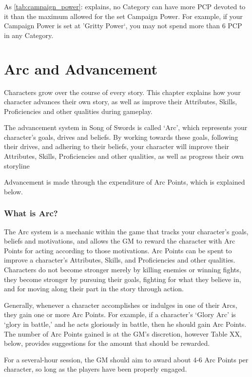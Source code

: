 \documentclass[oneside,11pt,english]{book}
\begin{document}
 
As \autoref{tab:campaign_power}:  explains, no Category can have more PCP devoted to it than the maximum allowed for the 
set Campaign Power. For example, if your Campaign Power is set at 'Gritty Power`, you may not spend 
more than 6 PCP in any Category. 
\chapter{Arc and Advancement}\label{ch:arc} 
\clearpage
Characters grow over the course of every story. This chapter explains how your character advances their 
own story, as well as improve their Attributes, Skills, Proficiencies and other qualities during gameplay. 
 

The advancement system in Song of Swords is called ‘Arc’, which represents your character’s goals, 
drives and beliefs. By working towards these goals, following their drives, and adhering to their beliefs, 
your character will improve their Attributes, Skills, Proficiencies and other qualities, as well as progress 
their own storyline 

 
Advancement is made through the expenditure of Arc Points, which is explained below. 

 
\subsection*{What is Arc?}
The Arc system is a mechanic within the game that tracks your character’s goals, beliefs and motivations, 
and allows the GM to reward the character with Arc Points for acting according to those motivations. Arc 
Points can be spent to improve a character’s Attributes, Skills, and Proficiencies and other qualities. 
Characters do not become stronger merely by killing enemies or winning fights, they become stronger by 
pursuing their goals, fighting for what they believe in, and for moving along their part in the story through 
action. 

 
Generally, whenever a character accomplishes or indulges in one of their Arcs, they gain one or more Arc 
Points. For example, if a character’s ‘Glory Arc’ is ‘glory in battle,’ and he acts gloriously in battle, then 
he should gain Arc Points. The number of Arc Points gained is at the GM’s discretion, however Table 
XX, below, provides suggestions for the amount that should be rewarded. 

 
For a several-hour session, the GM should aim to award about 4-6 Arc Points per character, so long as the 
players have been properly engaged. 
 
\end{document}
